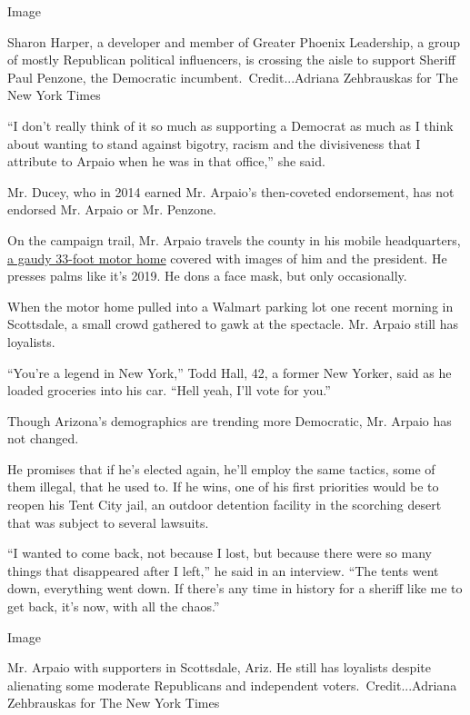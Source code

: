 Image

Sharon Harper, a developer and member of Greater Phoenix Leadership, a
group of mostly Republican political influencers, is crossing the aisle
to support Sheriff Paul Penzone, the Democratic
incumbent.~Credit...Adriana Zehbrauskas for The New York Times

``I don't really think of it so much as supporting a Democrat as much as
I think about wanting to stand against bigotry, racism and the
divisiveness that I attribute to Arpaio when he was in that office,''
she said.

Mr. Ducey, who in 2014 earned Mr. Arpaio's then-coveted endorsement, has
not endorsed Mr. Arpaio or Mr. Penzone.

On the campaign trail, Mr. Arpaio travels the county in his mobile
headquarters,
\href{https://www.fhtimes.com/news/local_news/arpaio-campaign-hits-the-road/article_4a6b2e6a-c07d-11ea-8db5-ab2ad6fe3a1f.html}{a
gaudy 33-foot motor home} covered with images of him and the president.
He presses palms like it's 2019. He dons a face mask, but only
occasionally.

When the motor home pulled into a Walmart parking lot one recent morning
in Scottsdale, a small crowd gathered to gawk at the spectacle. Mr.
Arpaio still has loyalists.

``You're a legend in New York,'' Todd Hall, 42, a former New Yorker,
said as he loaded groceries into his car. ``Hell yeah, I'll vote for
you.''

Though Arizona's demographics are trending more Democratic, Mr. Arpaio
has not changed.

He promises that if he's elected again, he'll employ the same tactics,
some of them illegal, that he used to. If he wins, one of his first
priorities would be to reopen his Tent City jail, an outdoor detention
facility in the scorching desert that was subject to several lawsuits.

``I wanted to come back, not because I lost, but because there were so
many things that disappeared after I left,'' he said in an interview.
``The tents went down, everything went down. If there's any time in
history for a sheriff like me to get back, it's now, with all the
chaos.''

Image

Mr. Arpaio with supporters in Scottsdale, Ariz. He still has loyalists
despite alienating some moderate Republicans and independent
voters.~Credit...Adriana Zehbrauskas for The New York Times

